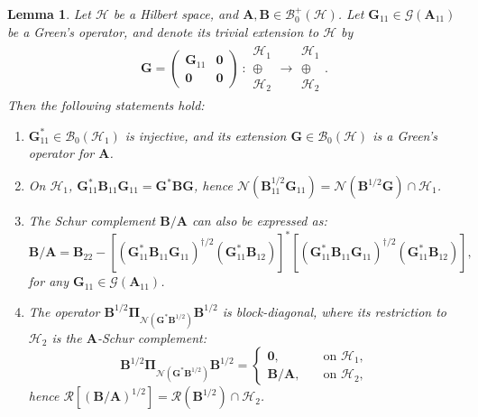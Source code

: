 \documentclass[noinfoline]{imsart}\setcounter{tocdepth}{2}
\newcommand{\m}[1]{\mathbf{#1}} %
\renewcommand{\c}[1]{\mathcal{#1}} %
\theoremstyle{plain}
\newtheorem{lemma}[theorem]{Lemma}
\begin{document}
\begin{lemma}\label{lem:Schur:op}
Let $\c{H}$ be a Hilbert space, and $\m{A}, \m{B} \in \c{B}_{0}^{+}(\c{H})$. Let $\m{G}_{11} \in \c{G}(\m{A}_{11})$ be a Green's operator, and denote its trivial extension to $\c{H}$ by
\begin{align*}
    \m{G} =
    \begin{pmatrix}
    \m{G}_{11} & \m{0} \\
    \m{0} & \m{0}
    \end{pmatrix}
    \    :
    \begin{array}{c}
    \c{H}_{1} \\
    \oplus \\
    \c{H}_{2}
    \end{array}
    \rightarrow
    \begin{array}{c}
    \c{H}_{1} \\
    \oplus \\
    \c{H}_{2}
    \end{array}.
\end{align*}
Then the following statements hold:
\begin{enumerate}[leftmargin = *]
    \item $\m{G}_{11}^{*} \in \c{B}_{0}(\c{H}_{1})$ is injective, and its extension $\m{G} \in \c{B}_{0}(\c{H})$ is a Green's operator for $\m{A}$.
    \item On $\c{H}_{1}$, $\m{G}_{11}^{*} \m{B}_{11} \m{G}_{11} = \m{G}^{*} \m{B} \m{G}$, hence $\c{N}(\m{B}_{11}^{1/2} \m{G}_{11}) = \c{N}(\m{B}^{1/2} \m{G}) \cap \c{H}_{1}$.
    \item The Schur complement $\m{B}/\m{A}$ can also be expressed as:
    \begin{equation*}
        \m{B}/\m{A} = \m{B}_{22} - [(\m{G}_{11}^{*} \m{B}_{11} \m{G}_{11})^{\dagger/2} (\m{G}_{11}^{*} \m{B}_{12})]^{*} [(\m{G}_{11}^{*} \m{B}_{11} \m{G}_{11})^{\dagger/2} (\m{G}_{11}^{*} \m{B}_{12})],
    \end{equation*}
    for any $\m{G}_{11} \in \c{G}(\m{A}_{11})$. 
    \item The operator $\m{B}^{1/2} \m{\Pi}_{\c{N}(\m{G}^{*} \m{B}^{1/2})} \m{B}^{1/2}$ is block-diagonal, where its restriction to $\c{H}_{2}$ is the $\m{A}$-Schur complement:
    \begin{equation*}
        \m{B}^{1/2} \m{\Pi}_{\c{N}(\m{G}^{*} \m{B}^{1/2})} \m{B}^{1/2} =
        \begin{cases}
            \m{0}, &\quad \text{on } \c{H}_{1}, \\
            \m{B}/\m{A}, &\quad \text{on } \c{H}_{2},
        \end{cases}
    \end{equation*}
    hence $\c{R} [(\m{B}/\m{A})^{1/2}] = \c{R}(\m{B}^{1/2}) \cap \c{H}_{2}$.
\end{enumerate}
\end{lemma}
\end{document}
